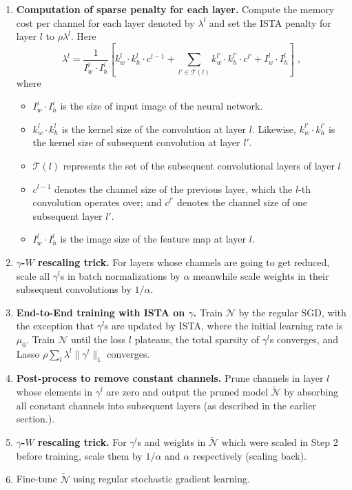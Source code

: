 \documentclass{article} %
\begin{document}
\begin{enumerate}
\item \textbf{Computation of sparse penalty for each layer.} 
Compute the memory cost per channel for each layer denoted by $\lambda^l$ and set the ISTA penalty
  for layer $l$ to $\rho \lambda^l$. Here
  \begin{equation}
  \lambda^l = \dfrac{1}{I^i_w \cdot I^i_h}\left[ k^l_w \cdot k^l_h \cdot c^{l-1} + \sum_{l'\in \mathcal{T} (l)} k^{l'}_w \cdot k^{l'}_h \cdot c^{l'}
    + I^l_w \cdot I^l_h \right]\;, \label{eq:penalty}
  \end{equation}
where
  \begin{itemize}
  \item $I^i_w \cdot I^i_h$ is the size of input image of the neural network.
  \item $k^l_w \cdot k^l_h$ is the kernel size of the convolution at layer $l$. Likewise,
    $k^{l'}_w \cdot k^{l'}_h$ is the kernel size of subsequent convolution at layer $l'$.
  \item $\mathcal T(l)$ represents the set of the subsequent convolutional layers of layer $l$  
  \item $c^{l-1}$ denotes the channel size of the previous layer, which the $l$-th convolution operates over;
    and $c^{l'}$ denotes the channel size of one subsequent layer $l'$.
  \item $I_w^l \cdot I_h^l$ is the image size of the feature map at layer $l$.
  \end{itemize}
\item \textbf{$\gamma$-$W$ rescaling trick.} For layers whose channels are going to get reduced, scale all $\gamma^l$s in batch normalizations
  by $\alpha$ meanwhile scale weights in their subsequent convolutions by $1/\alpha$.
\item \textbf{End-to-End training with ISTA on $\gamma$.} Train $\mathcal N$ by the regular SGD, with the exception that $\gamma^l$s are updated by ISTA,
  where the initial learning rate is $\mu_0$. Train $\mathcal N$ until the loss $l$ plateaus, the total sparsity
  of $\gamma^l$s converges, and Lasso $\rho \sum_l \lambda^l \|\gamma^l\|_1$ converges.
\item \textbf{Post-process to remove constant channels.} Prune channels in layer $l$ whose elements in $\gamma^l$ are zero and output the
  pruned model $\widetilde{\mathcal N}$ by absorbing all constant channels into subsequent layers
  (as described in the earlier section.). 
\item \textbf{$\gamma$-$W$ rescaling trick.} For $\gamma^l$s and weights in $\widetilde{\mathcal N}$ which
  were scaled in Step 2 before training, scale them by $1/\alpha$ and $\alpha$ respectively (scaling back).
\item Fine-tune $\widetilde{\mathcal N}$ using regular stochastic gradient learning.
\end{enumerate}
\end{document}
